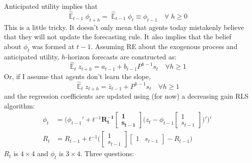 \documentclass[11pt]{article}
\renewcommand{\[}{\begin{equation}}
\renewcommand{\]}{\end{equation}}
\DeclareMathOperator{\E}{\mathbb{E}}
\begin{document}
Anticipated utility implies that
\begin{equation}
\hat{\E}_{t-1}{\phi_{t+h}} = \hat{\E}_{t-1}{\phi_{t}} \equiv \phi_{t-1} \quad \forall \; h\geq0 
\end{equation}
This is a little tricky. It doesn't only mean that agents today mistakenly believe that they will not update the forecasting rule. It also implies that the belief about $\phi_t$ was formed at $t-1$.
Assuming RE about the exogenous process and anticipated utility, $h$-horizon forecasts are constructed as:
\begin{equation}
\hat{\E}_t z_{t+h} = a_{t-1} + b_{t-1}P^{h-1}s_t  \quad \forall h\geq 1 \label{PLM_fcst_general}
\end{equation}
Or, if I assume that agents don't learn the slope, 
\begin{equation}
\hat{\E}_t z_{t+h} = \bar{z}_{t-1} + P^{h-1}s_t  \quad \forall h\geq 1 \label{PLM_fcst}
\end{equation}
and the regression coefficients are updated using (for now) a decreasing gain RLS algorithm:
\begin{align}
\phi_t  & = \bigg( \phi_{t-1}' + t^{-1} \mathbf{R_t^{-1}}\begin{bmatrix} \mathbf{1} \\ \mathbf{s_{t-1}} \end{bmatrix}\bigg(z_{t} - \phi_{t-1} \begin{bmatrix} 1 \\ s_{t-1} \end{bmatrix} \bigg)' \bigg)' \\
R_t &= R_{t-1} +  t^{-1} \bigg( \begin{bmatrix} 1 \\ s_{t-1} \end{bmatrix} \begin{bmatrix} 1 & s_{t-1} \end{bmatrix}  - R_{t-1} \bigg)
\end{align}
$R_t$ is $4\times 4$ and $\phi_t$ is $3 \times 4$. Three questions:
\end{document}
